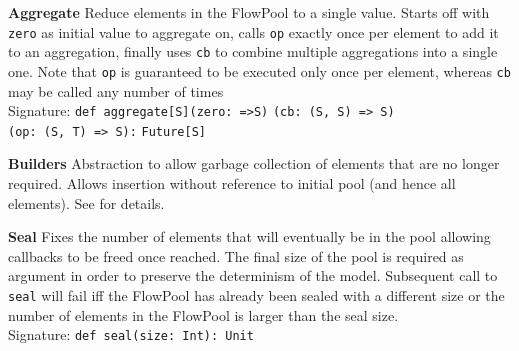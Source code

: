 \documentclass[runningheads,a4paper,fleqn]{llncs}
\begin{document}
\textbf{Aggregate} Reduce elements in the FlowPool to a single
value. Starts off with \verb+zero+ as initial value to aggregate on,
calls \verb+op+ exactly once per element to add it to an aggregation,
finally uses \verb+cb+ to combine multiple aggregations into a single
one. Note that \verb+op+ is guaranteed to be executed only once per
element, whereas \verb+cb+ may be called any number of times\\
Signature: \verb+def aggregate[S]+\verb+(zero: =>S)+
\verb+(cb: (S, S) => S)+\\
\verb+(op: (S, T) => S):+ \verb+Future[S]+

\textbf{Builders} Abstraction to allow garbage collection of elements
that are no longer required. Allows insertion without reference to
initial pool (and hence all elements). See \cite{FP12} for details.

\textbf{Seal} Fixes the number of elements that will eventually be in
the pool allowing callbacks to be freed once reached. The final size
of the pool is required as argument in order to preserve the
determinism of the model. Subsequent call to \verb+seal+ will fail iff
the FlowPool has already been sealed with a different size or the
number of elements in the FlowPool is larger than the seal size.\\
Signature: \verb+def seal(size: Int): Unit+
\end{document}
